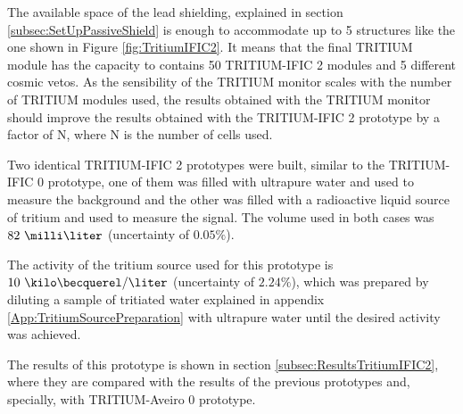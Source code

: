 The available space of the lead shielding, explained in section \ref{subsec:SetUpPassiveShield} is enough to accommodate up to 5 structures like the one shown in Figure \ref{fig:TritiumIFIC2}. It means that the final TRITIUM module has the capacity to contains 50 TRITIUM-IFIC 2 modules and 5 different cosmic vetos. As the sensibility of the TRITIUM monitor scales with the number of TRITIUM modules used, the results obtained with the TRITIUM monitor should improve the results obtained with the TRITIUM-IFIC 2 prototype by a factor of N, where N is the number of cells used.

Two identical TRITIUM-IFIC 2 prototypes were built, similar to the TRITIUM-IFIC 0 prototype, one of them was filled with ultrapure water and used to measure the background and the other was filled with a radioactive liquid source of tritium and used to measure the signal. The volume used in both cases was $82~\milli\liter$ (uncertainty of $0.05\%$).

The activity of the tritium source used for this prototype is $10~\kilo\becquerel/\liter$ (uncertainty of $2.24\%$), which was prepared by diluting a sample of tritiated water explained in appendix \ref{App:TritiumSourcePreparation} with ultrapure water until the desired activity was achieved.

The results of this prototype is shown in section \ref{subsec:ResultsTritiumIFIC2}, where they are compared with the results of the previous prototypes and, specially, with TRITIUM-Aveiro 0 prototype.